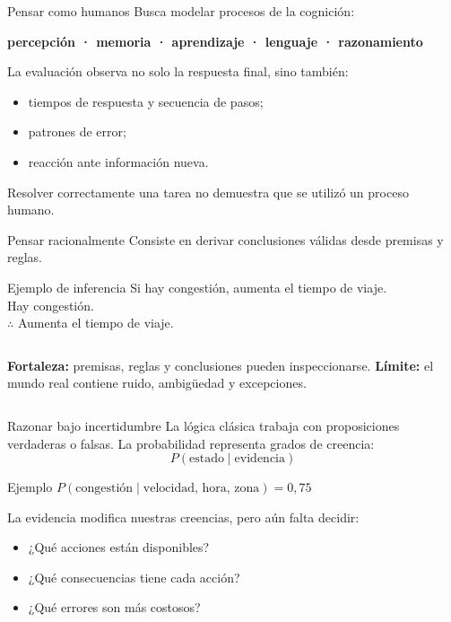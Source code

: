 \documentclass[aspectratio=169,11pt]{beamer}
\newcommand{\concepto}[1]{\textcolor{UAPTeal}{\textbf{#1}}}
\begin{document}
\begin{frame}{Pensar como humanos}
  Busca modelar procesos de la cognición:
  \begin{center}
    \concepto{percepción · memoria · aprendizaje · lenguaje · razonamiento}
  \end{center}
  La evaluación observa no solo la respuesta final, sino también:
  \begin{itemize}
    \item tiempos de respuesta y secuencia de pasos;
    \item patrones de error;
    \item reacción ante información nueva.
  \end{itemize}
  \vfill
  \centering\alert{Resolver correctamente una tarea no demuestra que se utilizó un proceso humano.}
\end{frame}

\begin{frame}{Pensar racionalmente}
  Consiste en derivar conclusiones válidas desde premisas y reglas.
  \begin{block}{Ejemplo de inferencia}
    Si hay congestión, aumenta el tiempo de viaje.\\
    Hay congestión.\\
    $\therefore$ Aumenta el tiempo de viaje.
  \end{block}
  \begin{columns}[T]
      \textbf{Fortaleza:} premisas, reglas y conclusiones pueden inspeccionarse.
      \textbf{Límite:} el mundo real contiene ruido, ambigüedad y excepciones.
  \end{columns}
\end{frame}

\begin{frame}{Razonar bajo incertidumbre}
  La lógica clásica trabaja con proposiciones verdaderas o falsas. La probabilidad representa grados de creencia:
  \[
    P(\text{estado}\mid\text{evidencia})
  \]
  \begin{block}{Ejemplo}
    \centering $P(\text{congestión}\mid\text{velocidad, hora, zona}) = 0{,}75$
  \end{block}
  La evidencia modifica nuestras creencias, pero aún falta decidir:
  \begin{itemize}
    \item ¿Qué acciones están disponibles?
    \item ¿Qué consecuencias tiene cada acción?
    \item ¿Qué errores son más costosos?
  \end{itemize}
\end{frame}
\end{document}
